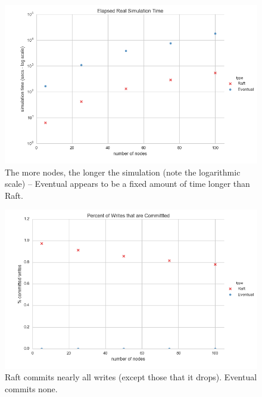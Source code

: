 \documentclass[11pt,letterpaper]{article}
\begin{document}
\begin{figure}[!h]
    \centering
        \includegraphics[width=\textwidth]{figures/simulation_time.png}
        \caption{\textsf{The more nodes, the longer the simulation (note the logarithmic scale) -- Eventual appears to be a fixed amount of time longer than Raft.}}
        \label{fig:simulation_time}
\end{figure}

\begin{figure}[!h]
    \centering
        \includegraphics[width=\textwidth]{figures/committed_writes.png}
        \caption{\textsf{Raft commits nearly all writes (except those that it drops). Eventual commits none.}}
        \label{fig:committed_writes}
\end{figure}
\end{document}
